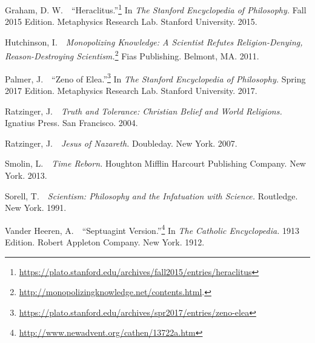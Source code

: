 \documentclass[twocolumn]{article}
\begin{document}
\begin{thebibliography}{}
\begin{small}
      Graham, D. W.\ \ ``Heraclitus.''\footnote{%
         \url{https://plato.stanford.edu/archives/fall2015/entries/heraclitus}
      }
      In {\it The Stanford Encyclopedia of Philosophy.}  Fall 2015 Edition.
      Metaphysics Research Lab.  Stanford University.  2015.

      Hutchinson, I.\ \ {\it Monopolizing Knowledge: A Scientist Refutes
      Religion-Denying, Reason-Destroying Scientism.}\footnote{%
         \url{http://monopolizingknowledge.net/contents.html}.%
      }
      Fias Publishing.  Belmont, MA.  2011.

      Palmer, J.\ \ ``Zeno of Elea.''\footnote{%
         \url{https://plato.stanford.edu/archives/spr2017/entries/zeno-elea}%
      }
      In {\it The Stanford Encyclopedia of Philosophy.}  Spring 2017 Edition.
      Metaphysics Research Lab.  Stanford University.  2017.

      Ratzinger, J.\ \ {\it Truth and Tolerance: Christian Belief and World
      Religions.}  Ignatius Press.  San Francisco.  2004.

      Ratzinger, J.\ \ {\it Jesus of Nazareth.}  Doubleday.  New York.  2007.

      Smolin, L.\ \ {\it Time Reborn.}  Houghton Mifflin Harcourt Publishing
      Company.  New York.  2013.

      Sorell, T.\ \ {\it Scientism: Philosophy and the Infatuation with
      Science.}  Routledge.  New York.  1991.

      Vander Heeren, A.\ \ ``Septuagint Version.''\footnote{%
         \url{http://www.newadvent.org/cathen/13722a.htm}%
      }
      In {\it The Catholic Encyclopedia.}  1913 Edition.  Robert Appleton
      Company.  New York.  1912.

   \end{small}

\end{thebibliography}


\end{document}
